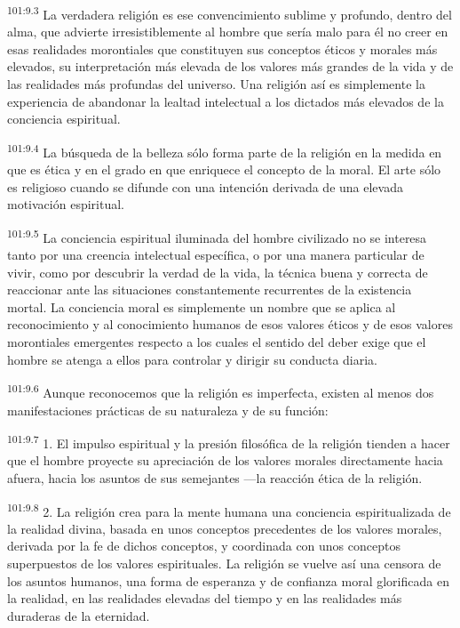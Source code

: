 \par
\textsuperscript{101:9.3} La verdadera religión es ese convencimiento sublime y profundo, dentro del alma, que advierte irresistiblemente al hombre que sería malo para él no creer en esas realidades morontiales que constituyen sus conceptos éticos y morales más elevados, su interpretación más elevada de los valores más grandes de la vida y de las realidades más profundas del universo. Una religión así es simplemente la experiencia de abandonar la lealtad intelectual a los dictados más elevados de la conciencia espiritual.

\par
\textsuperscript{101:9.4} La búsqueda de la belleza sólo forma parte de la religión en la medida en que es ética y en el grado en que enriquece el concepto de la moral. El arte sólo es religioso cuando se difunde con una intención derivada de una elevada motivación espiritual.

\par
\textsuperscript{101:9.5} La conciencia espiritual iluminada del hombre civilizado no se interesa tanto por una creencia intelectual específica, o por una manera particular de vivir, como por descubrir la verdad de la vida, la técnica buena y correcta de reaccionar ante las situaciones constantemente recurrentes de la existencia mortal. La conciencia moral es simplemente un nombre que se aplica al reconocimiento y al conocimiento humanos de esos valores éticos y de esos valores morontiales emergentes respecto a los cuales el sentido del deber exige que el hombre se atenga a ellos para controlar y dirigir su conducta diaria.

\par
\textsuperscript{101:9.6} Aunque reconocemos que la religión es imperfecta, existen al menos dos manifestaciones prácticas de su naturaleza y de su función:

\par
\textsuperscript{101:9.7} 1. El impulso espiritual y la presión filosófica de la religión tienden a hacer que el hombre proyecte su apreciación de los valores morales directamente hacia afuera, hacia los asuntos de sus semejantes ---la reacción ética de la religión.

\par
\textsuperscript{101:9.8} 2. La religión crea para la mente humana una conciencia espiritualizada de la realidad divina, basada en unos conceptos precedentes de los valores morales, derivada por la fe de dichos conceptos, y coordinada con unos conceptos superpuestos de los valores espirituales. La religión se vuelve así una censora de los asuntos humanos, una forma de esperanza y de confianza moral glorificada en la realidad, en las realidades elevadas del tiempo y en las realidades más duraderas de la eternidad.

